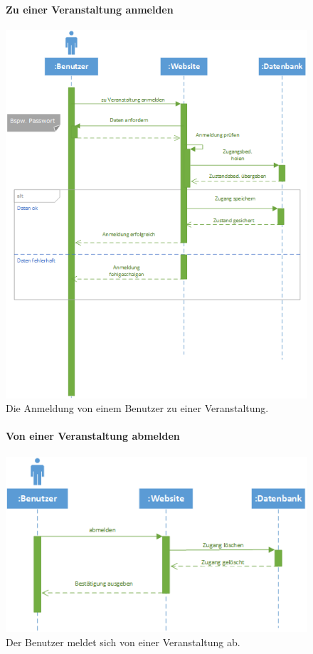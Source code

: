 \documentclass[12pt,a4paper]{article}
\begin{document}
\begin{figure}[H]
	\centering
	\paragraph{Zu einer Veranstaltung anmelden}
	\includegraphics[width=\textwidth]{Bilder/Sequenzdiagramme/ZuVeranstaltungAnmelden.png}
	\caption{Die Anmeldung von einem Benutzer zu einer Veranstaltung.}
	\label{SzZuVeranstaltungAnmelden}
\end{figure}
\begin{figure}[H]
	\centering
	\paragraph{Von einer Veranstaltung abmelden}
	\includegraphics[width=\textwidth]{Bilder/Sequenzdiagramme/VonVeranstaltungAbmelden.png}
	\caption{Der Benutzer meldet sich von einer Veranstaltung ab.}
	\label{SzVonVeranstaltungAbmelden}
\end{figure}
\end{document}
